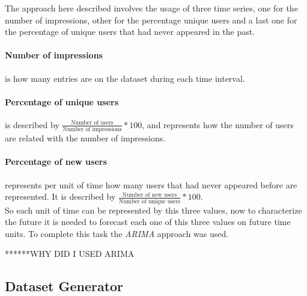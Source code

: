 The approach here described involves the usage of three time series, one for the
number of impressions, other for the percentage unique users and a last one for
the percentage of unique users that had never appeared in the past.

\paragraph{Number of impressions}
is how many entries are on the dataset during each time interval.

\paragraph{Percentage of unique users}
is described by $\frac{\text{Number of users}}{\text{Number of impressions}}
* 100$, and represents how the number of users are related with the number of
impressions.

\paragraph{Percentage of new users}
represents per unit of time how many users that had never appeared before are
represented. It is described by $\frac{\text{Number of new users}}{\text{Number
of unique users}}*100$.
\\

So each unit of time can be represented by this three values, now to
characterize the future it is needed to forecast each one of this three values
on future time units. To complete this task the \emph{ARIMA} approach was used.


******WHY DID I USED ARIMA

\subsection{Dataset Generator}

